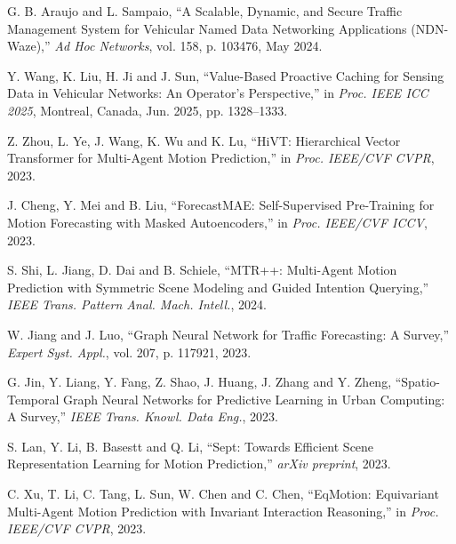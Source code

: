  G. B. Araujo and L. Sampaio, ``A Scalable, Dynamic, and Secure Traffic Management System for Vehicular Named Data Networking Applications (NDN-Waze),'' \emph{Ad Hoc Networks}, vol. 158, p. 103476, May 2024.

 Y. Wang, K. Liu, H. Ji and J. Sun, ``Value-Based Proactive Caching for Sensing Data in Vehicular Networks: An Operator's Perspective,'' in \emph{Proc. IEEE ICC 2025}, Montreal, Canada, Jun. 2025, pp. 1328--1333.


 Z. Zhou, L. Ye, J. Wang, K. Wu and K. Lu, ``HiVT: Hierarchical Vector Transformer for Multi-Agent Motion Prediction,'' in \emph{Proc. IEEE/CVF CVPR}, 2023.

 J. Cheng, Y. Mei and B. Liu, ``ForecastMAE: Self-Supervised Pre-Training for Motion Forecasting with Masked Autoencoders,'' in \emph{Proc. IEEE/CVF ICCV}, 2023.

 S. Shi, L. Jiang, D. Dai and B. Schiele, ``MTR++: Multi-Agent Motion Prediction with Symmetric Scene Modeling and Guided Intention Querying,'' \emph{IEEE Trans. Pattern Anal. Mach. Intell.}, 2024.

 W. Jiang and J. Luo, ``Graph Neural Network for Traffic Forecasting: A Survey,'' \emph{Expert Syst. Appl.}, vol. 207, p. 117921, 2023.

 G. Jin, Y. Liang, Y. Fang, Z. Shao, J. Huang, J. Zhang and Y. Zheng, ``Spatio-Temporal Graph Neural Networks for Predictive Learning in Urban Computing: A Survey,'' \emph{IEEE Trans. Knowl. Data Eng.}, 2023.

 S. Lan, Y. Li, B. Basestt and Q. Li, ``Sept: Towards Efficient Scene Representation Learning for Motion Prediction,'' \emph{arXiv preprint}, 2023.

 C. Xu, T. Li, C. Tang, L. Sun, W. Chen and C. Chen, ``EqMotion: Equivariant Multi-Agent Motion Prediction with Invariant Interaction Reasoning,'' in \emph{Proc. IEEE/CVF CVPR}, 2023.

